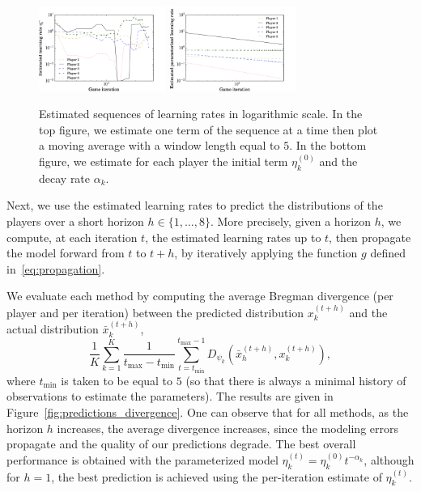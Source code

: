 \documentclass{sig-alternate-ipsn13}
\begin{document}
\begin{figure}[h!]
  \centering
  \includegraphics[width=0.37\textwidth]{images/moving_average_learning_rate}
  \includegraphics[width=0.37\textwidth]{images/sequence_rate}
  \caption{\footnotesize Estimated sequences of learning rates in logarithmic scale. In the top figure, we estimate one term of the sequence at a time then plot a moving average with a window length equal to $5$. In the bottom figure, we estimate for each player the initial term $\eta^{(0)}_k$ and the decay rate $\alpha_k$.\vspace{-.1in}}
  \label{fig:moving_average_learning_rate}
  \label{fig:sequence_rate}
\end{figure}





Next, we use the estimated learning rates to predict the distributions of the players over a short horizon $h \in \{1, \dots, 8\}$. More precisely, given a horizon $h$, we compute, at each iteration $t$, the estimated learning rates up to $t$, then propagate the model forward from $t$ to $t+h$, by iteratively applying the function $g$ defined in~\eqref{eq:propagation}.

We evaluate each method by computing the average Bregman divergence (per player and per iteration) between the predicted distribution $x^{(t+h)}_k$ and the actual distribution $\bar x^{(t+h)}_k$,
\[
\frac{1}{K} \sum_{k = 1}^K \frac{1}{t_{\max} - t_{\min}} \sum_{t = t_{\min}}^{t_{\max}-1} D_{\psi_k} (\bar x^{(t+h)}_h, x^{(t+h)}_k),
\]
where $t_{\min}$ is taken to be equal to $5$ (so that there is always a minimal history of observations to estimate the parameters). The results are given in Figure~\ref{fig:predictions_divergence}. One can observe that for all methods, as the horizon $h$ increases, the average divergence increases, since the modeling errors propagate and the quality of our predictions degrade. The best overall performance is obtained with the parameterized model $\eta^{(t)}_k = \eta^{(0)}_k t^{-\alpha_k}$, although for $h = 1$, the best prediction is achieved using the per-iteration estimate of $\eta^{(t)}_k$. 
\end{document}
